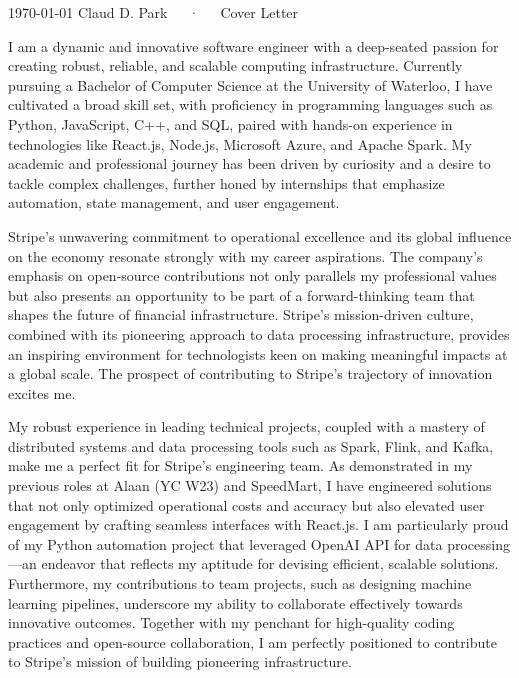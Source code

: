 \documentclass[11pt, a4paper]{awesome-cv}
\begin{document}
\makecvheader[C]

\makecvfooter
  {\today}
  {Claud D. Park~~~·~~~Cover Letter}
  {}

\makelettertitle

\begin{cvletter}

I am a dynamic and innovative software engineer with a deep-seated passion for creating robust, reliable, and scalable computing infrastructure. Currently pursuing a Bachelor of Computer Science at the University of Waterloo, I have cultivated a broad skill set, with proficiency in programming languages such as Python, JavaScript, C++, and SQL, paired with hands-on experience in technologies like React.js, Node.js, Microsoft Azure, and Apache Spark. My academic and professional journey has been driven by curiosity and a desire to tackle complex challenges, further honed by internships that emphasize automation, state management, and user engagement.

Stripe's unwavering commitment to operational excellence and its global influence on the economy resonate strongly with my career aspirations. The company's emphasis on open-source contributions not only parallels my professional values but also presents an opportunity to be part of a forward-thinking team that shapes the future of financial infrastructure. Stripe's mission-driven culture, combined with its pioneering approach to data processing infrastructure, provides an inspiring environment for technologists keen on making meaningful impacts at a global scale. The prospect of contributing to Stripe's trajectory of innovation excites me.

My robust experience in leading technical projects, coupled with a mastery of distributed systems and data processing tools such as Spark, Flink, and Kafka, make me a perfect fit for Stripe's engineering team. As demonstrated in my previous roles at Alaan (YC W23) and SpeedMart, I have engineered solutions that not only optimized operational costs and accuracy but also elevated user engagement by crafting seamless interfaces with React.js. I am particularly proud of my Python automation project that leveraged OpenAI API for data processing—an endeavor that reflects my aptitude for devising efficient, scalable solutions. Furthermore, my contributions to team projects, such as designing machine learning pipelines, underscore my ability to collaborate effectively towards innovative outcomes. Together with my penchant for high-quality coding practices and open-source collaboration, I am perfectly positioned to contribute to Stripe's mission of building pioneering infrastructure.

\end{cvletter}


\makeletterclosing
\end{document}
